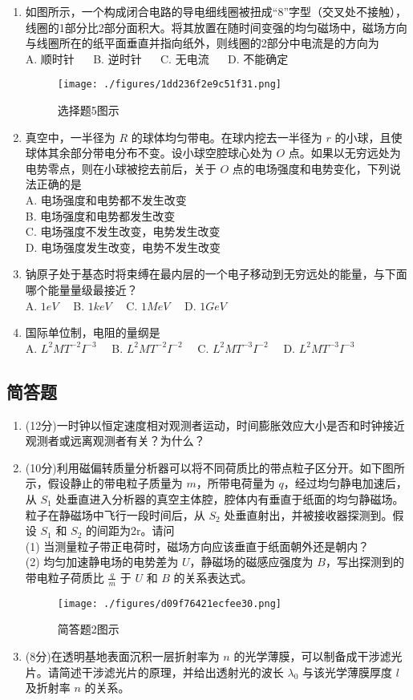 \begin{enumerate}
\item 如图所示，一个构成闭合电路的导电细线圈被扭成“8”字型（交叉处不接触），线圈的1部分比2部分面积大。将其放置在随时间变强的均匀磁场中，磁场方向与线圈所在的纸平面垂直并指向纸外，则线圈的2部分中电流是的方向为\\
A. 顺时针 $\quad$
B. 逆时针 $\quad$
C. 无电流 $\quad$
D. 不能确定 $\quad$
\begin{figure}[ht]
\centering
\texttt{[image: ./figures/1dd236f2e9c51f31.png]}
\caption{选择题5图示} \label{fig_CAS17_2}
\end{figure}
\item 真空中，一半径为 $R$ 的球体均匀带电。在球内挖去一半径为 $r$ 的小球，且使球体其余部分带电分布不变。设小球空腔球心处为 $O$ 点。如果以无穷远处为电势零点，则在小球被挖去前后，关于 $O$ 点的电场强度和电势变化，下列说法正确的是\\
A. 电场强度和电势都不发生改变 \\
B. 电场强度和电势都发生改变 \\
C. 电场强度不发生改变，电势发生改变 \\
D. 电场强度发生改变，电势不发生改变 \\
\item 钠原子处于基态时将束缚在最内层的一个电子移动到无穷远处的能量，与下面哪个能量量级最接近？\\
A. $1eV\quad$
B. $1keV\quad$
C. $1MeV\quad$
D. $1GeV\quad$
\item 国际单位制，电阻的量纲是\\
A. $L^{2}MT^{-2}I^{-3}\quad$
B. $L^{2}MT^{-2}I^{-2}\quad$
C. $L^{2}MT^{-3}I^{-2}\quad$
D. $L^{2}MT^{-3}I^{-3}\quad$
\end{enumerate}
\subsection{简答题}
\begin{enumerate}
\item (12分)一时钟以恒定速度相对观测者运动，时间膨胀效应大小是否和时钟接近观测者或远离观测者有关？为什么？
\item (10分)利用磁偏转质量分析器可以将不同荷质比的带点粒子区分开。如下图所示，假设静止的带电粒子质量为 $m$，所带电荷量为 $q$，经过均匀静电加速后，从 $S_{1}$ 处垂直进入分析器的真空主体腔，腔体内有垂直于纸面的均匀静磁场。粒子在静磁场中飞行一段时间后，从 $S_{2}$ 处垂直射出，并被接收器探测到。假设 $S_{1}$ 和 $S_{2}$ 的间距为2r。请问\\
(1) 当测量粒子带正电荷时，磁场方向应该垂直于纸面朝外还是朝内？\\
(2) 均匀加速静电场的电势差为 $U$，静磁场的磁感应强度为 $B$，写出探测到的带电粒子荷质比 $\frac{q}{m}$ 于 $U$ 和 $B$ 的关系表达式。\\
\begin{figure}[ht]
\centering
\texttt{[image: ./figures/d09f76421ecfee30.png]}
\caption{简答题2图示} \label{fig_CAS17_3}
\end{figure}
\item (8分)在透明基地表面沉积一层折射率为 $n$ 的光学薄膜，可以制备成干涉滤光片。请简述干涉滤光片的原理，并给出透射光的波长 $\lambda_{0}$ 与该光学薄膜厚度 $l$ 及折射率 $n$ 的关系。
\end{enumerate}

